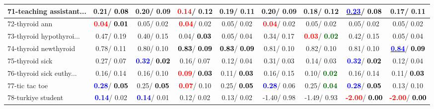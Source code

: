 \begin{table}[h]
\begin{center}
\begin{tabular}{lc|c|c|c|c|c|c|c}
71-teaching assistant... &   0.21/\textcolor{black}{\textbf{  0.08}} &   0.20/  0.09 & \textcolor{red}{\textbf{  0.14}}/  0.12 &   0.19/  0.11 &   0.20/  0.09 &   0.18/  0.12 & \underline{\textcolor{blue}{\textbf{  0.23}}}/\textcolor{black}{\textbf{  0.08}} &   0.17/  0.11 \\ \hline
72-thyroid ann & \textcolor{red}{\textbf{  0.04}}/\textcolor{black}{\textbf{  0.01}} &   0.05/  0.02 & \textcolor{red}{\textbf{  0.04}}/  0.02 &   0.05/  0.02 & \textcolor{red}{\textbf{  0.04}}/  0.02 &   0.05/  0.02 &   0.05/  0.02 &   0.05/  0.02 \\
73-thyroid hypothyroi... &   0.47/  0.19 &   0.40/  0.15 &   0.04/\textcolor{black}{\textbf{  0.03}} &   0.05/  0.04 &   0.34/  0.17 & \textcolor{red}{\textbf{  0.03}}/\textcolor{darkgreen}{\textbf{  0.02}} &   0.42/  0.15 &   0.05/  0.04 \\
74-thyroid newthyroid &   0.78/  0.11 &   0.80/  0.10 & \textcolor{black}{\textbf{  0.83}}/\textcolor{black}{\textbf{  0.09}} & \textcolor{black}{\textbf{  0.83}}/\textcolor{black}{\textbf{  0.09}} &   0.81/  0.10 &   0.82/  0.10 &   0.81/  0.10 & \underline{\textcolor{blue}{\textbf{  0.84}}}/\textcolor{black}{\textbf{  0.09}} \\
75-thyroid sick &   0.27/  0.07 & \textcolor{blue}{\textbf{  0.32}}/\textcolor{black}{\textbf{  0.02}} &   0.16/  0.07 &   0.12/  0.04 &   0.31/  0.03 &   0.14/  0.03 & \textcolor{blue}{\textbf{  0.32}}/\textcolor{black}{\textbf{  0.02}} &   0.12/  0.04 \\
76-thyroid sick euthy... &   0.16/  0.14 &   0.16/  0.10 & \textcolor{red}{\textbf{  0.09}}/\textcolor{black}{\textbf{  0.03}} &   0.11/\textcolor{black}{\textbf{  0.03}} &   0.16/  0.15 &   0.10/\textcolor{darkgreen}{\textbf{  0.02}} &   0.16/  0.14 &   0.11/\textcolor{black}{\textbf{  0.03}} \\
77-tic tac toe & \textcolor{blue}{\textbf{  0.28}}/\textcolor{black}{\textbf{  0.05}} &   0.25/\textcolor{black}{\textbf{  0.05}} & \textcolor{red}{\textbf{  0.07}}/  0.10 &   0.25/\textcolor{black}{\textbf{  0.05}} & \textcolor{blue}{\textbf{  0.28}}/  0.06 &   0.25/\textcolor{darkgreen}{\textbf{  0.04}} & \textcolor{blue}{\textbf{  0.28}}/\textcolor{black}{\textbf{  0.05}} &   0.13/  0.10 \\
78-turkiye student & \textcolor{blue}{\textbf{  0.14}}/  0.02 & \textcolor{blue}{\textbf{  0.14}}/  0.01 &   0.12/  0.02 &   0.13/  0.02 &  -1.40/  0.98 &  -1.49/  0.93 & \textcolor{red}{\textbf{ -2.00}}/\textcolor{black}{\textbf{  0.00}} & \textcolor{red}{\textbf{ -2.00}}/\textcolor{black}{\textbf{  0.00}} \\ \hline

\end{tabular}
\end{center}
\end{table}
